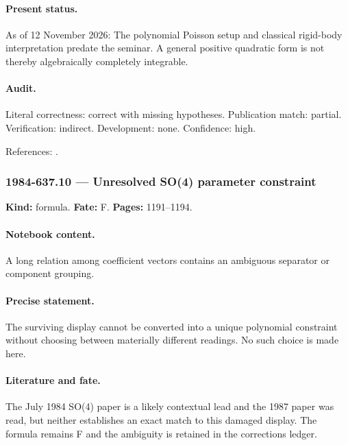 \paragraph{Present status.} As of 12 November 2026: The polynomial Poisson setup and classical rigid-body interpretation predate the seminar. A general positive quadratic form is not thereby algebraically completely integrable.

\paragraph{Audit.} Literal correctness: correct with missing hypotheses. Publication match: partial. Verification: indirect. Development: none. Confidence: high.

\noindent References: \citep{adler1982kowalewski,adler1984geodesic}.\par

\subsubsection{1984-637.10 --- Unresolved SO(4) parameter constraint}

\label{item:1984-637.10}

\noindent\textbf{Kind:} formula. \textbf{Fate:} F. \textbf{Pages:} 1191--1194.\par

\paragraph{Notebook content.} A long relation among coefficient vectors contains an ambiguous separator or component grouping.

\paragraph{Precise statement.} The surviving display cannot be converted into a unique polynomial constraint without choosing between materially different readings. No such choice is made here.

\paragraph{Literature and fate.} The July 1984 SO(4) paper is a likely contextual lead and the 1987 paper was read, but neither establishes an exact match to this damaged display. The formula remains F and the ambiguity is retained in the corrections ledger.

